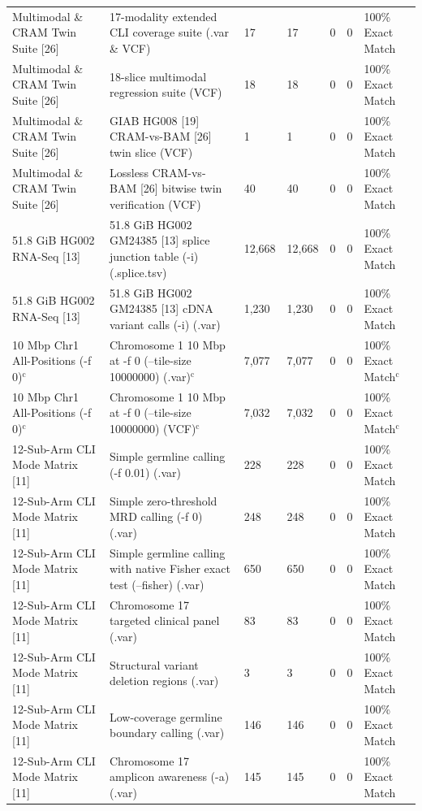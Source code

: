 \begin{table}[htbp]
{\begin{tabular}{lllllll}
Multimodal \& CRAM Twin Suite [26] & 17-modality extended CLI coverage suite (.var \& VCF) & 17 & 17 & 0 & 0 & 100\% Exact Match \\
Multimodal \& CRAM Twin Suite [26] & 18-slice multimodal regression suite (VCF) & 18 & 18 & 0 & 0 & 100\% Exact Match \\
Multimodal \& CRAM Twin Suite [26] & GIAB HG008 [19] CRAM-vs-BAM [26] twin slice (VCF) & 1 & 1 & 0 & 0 & 100\% Exact Match \\
Multimodal \& CRAM Twin Suite [26] & Lossless CRAM-vs-BAM [26] bitwise twin verification (VCF) & 40 & 40 & 0 & 0 & 100\% Exact Match \\
51.8 GiB HG002 RNA-Seq [13] & 51.8 GiB HG002 GM24385 [13] splice junction table (-i) (.splice.tsv) & 12,668 & 12,668 & 0 & 0 & 100\% Exact Match \\
51.8 GiB HG002 RNA-Seq [13] & 51.8 GiB HG002 GM24385 [13] cDNA variant calls (-i) (.var) & 1,230 & 1,230 & 0 & 0 & 100\% Exact Match \\
10 Mbp Chr1 All-Positions (-f 0)$^{\text{c}}$ & Chromosome 1 10 Mbp at -f 0 (--tile-size 10000000) (.var)$^{\text{c}}$ & 7,077 & 7,077 & 0 & 0 & 100\% Exact Match$^{\text{c}}$ \\
10 Mbp Chr1 All-Positions (-f 0)$^{\text{c}}$ & Chromosome 1 10 Mbp at -f 0 (--tile-size 10000000) (VCF)$^{\text{c}}$ & 7,032 & 7,032 & 0 & 0 & 100\% Exact Match$^{\text{c}}$ \\
12-Sub-Arm CLI Mode Matrix [11] & Simple germline calling (-f 0.01) (.var) & 228 & 228 & 0 & 0 & 100\% Exact Match \\
12-Sub-Arm CLI Mode Matrix [11] & Simple zero-threshold MRD calling (-f 0) (.var) & 248 & 248 & 0 & 0 & 100\% Exact Match \\
12-Sub-Arm CLI Mode Matrix [11] & Simple germline calling with native Fisher exact test (--fisher) (.var) & 650 & 650 & 0 & 0 & 100\% Exact Match \\
12-Sub-Arm CLI Mode Matrix [11] & Chromosome 17 targeted clinical panel (.var) & 83 & 83 & 0 & 0 & 100\% Exact Match \\
12-Sub-Arm CLI Mode Matrix [11] & Structural variant deletion regions (.var) & 3 & 3 & 0 & 0 & 100\% Exact Match \\
12-Sub-Arm CLI Mode Matrix [11] & Low-coverage germline boundary calling (.var) & 146 & 146 & 0 & 0 & 100\% Exact Match \\
12-Sub-Arm CLI Mode Matrix [11] & Chromosome 17 amplicon awareness (-a) (.var) & 145 & 145 & 0 & 0 & 100\% Exact Match \\

\end{tabular}}
\end{table}
